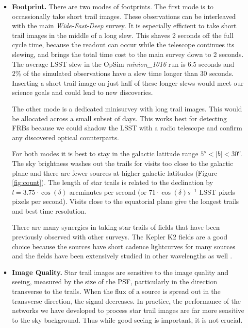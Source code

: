 \documentclass[12pt, letterpaper]{article}
\begin{document}
\begin{itemize}
\item \textbf{Footprint.} There are two modes of footprints. The first mode is to occassionally take short trail images. These observations can be interleaved with the main \textit{Wide-Fast-Deep} survey. It is especially efficient to take short trail images in the middle of a long slew. This shaves 2 seconds off the full cycle time, because the readout can occur while the telescope continues its slewing, and brings the total time cost to the main survey down to 2 seconds. The average LSST slew in the OpSim \textit{minion\_1016} run is 6.5 seconds and 2\% of the simulated observations have a slew time longer than 30 seconds. Inserting a short trail image on just half of these longer slews would meet our science goals and could lead to new discoveries. 

The other mode is a dedicated minisurvey with long trail images. This would be allocated across a small subset of days. This works best for detecting FRBs because we could shadow the LSST with a radio telescope and confirm any discovered optical counterparts.

For both modes it is best to stay in the galactic latitude range $5^o < |b| < 30^o$. The sky brightness washes out the trails for visits too close to the galactic plane and there are fewer sources at higher galactic latitudes (Figure \ref{fig:count}). The length of star trails is related to the declination by $l = 3.75 \cdot \cos(\delta)$ arcminutes per second (or $71 \cdot \cos(\delta) s^{-1}$ LSST pixels pixels per second). Visits close to the equatorial plane give the longest trails and best time resolution. 

There are many synergies in taking star trails of fields that have been previously observed with other surveys. The Kepler K2 fields \citep{2014PASP..126..398H} are a good choice because the sources have short cadence lightcurves for many sources and the fields have been extensively studied in other wavelengths as well \citep{2016HEAD...1510605S}.

\item \textbf{Image Quality.} Star trail images are sensitive to the image quality and seeing, measured by the size of the PSF, particularly in the direction transverse to the trails. When the flux of a source is spread out in the transverse direction, the signal decreases. In practice, the performance of the networks we have developed to process star trail images are far more sensitive to the sky background. Thus while good seeing is important, it is not crucial.


\end{itemize}
\end{document}
